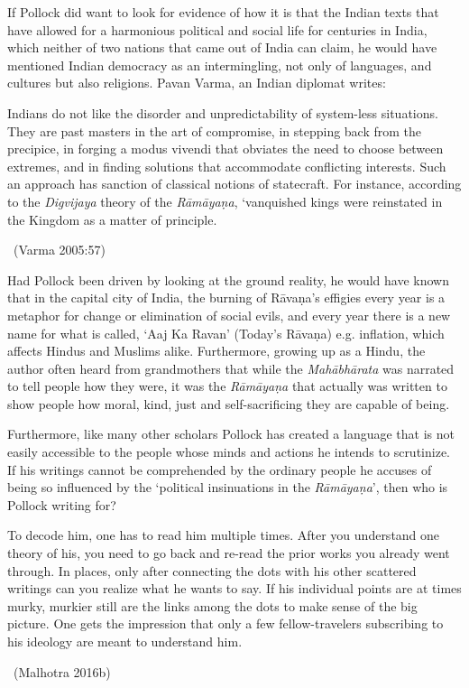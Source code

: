 If Pollock did want to look for evidence of how it is that the Indian texts that have allowed for a harmonious political and social life for centuries in India, which neither of two nations that came out of India can claim, he would have mentioned Indian democracy as an intermingling, not only of languages, and cultures but also religions. Pavan Varma, an Indian diplomat writes:

\begin{myquote}
Indians do not like the disorder and unpredictability of system-less situations. They are past masters in the art of compromise, in stepping back from the precipice, in forging a modus vivendi that obviates the need to choose between extremes, and in finding solutions that accommodate conflicting interests. Such an approach has sanction of classical notions of statecraft. For instance, according to the \textit{Digvijaya} theory of the \textit{Rāmāyaṇa}, ‘vanquished kings were reinstated in the Kingdom as a matter of principle. 

~\hfill (Varma 2005:57)
\end{myquote}

Had Pollock been driven by looking at the ground reality, he would have known that in the capital city of India, the burning of Rāvaṇa’s effigies every year is a metaphor for change or elimination of social evils, and every year there is a new name for what is called, ‘Aaj Ka Ravan’ (Today’s Rāvaṇa) e.g. inflation, which affects Hindus and Muslims alike. Furthermore, growing up as a Hindu, the author often heard from grandmothers that while the \textit{Mahābhārata} was narrated to tell people how they were, it was the \textit{Rāmāyaṇa} that actually was written to show people how moral, kind, just and self-sacrificing they are capable of being.

Furthermore, like many other scholars Pollock has created a language that is not easily accessible to the people whose minds and actions he intends to scrutinize. If his writings cannot be comprehended by the ordinary people he accuses of being so influenced by the ‘political insinuations in the \textit{Rāmāyaṇa}’, then who is Pollock writing for?

\begin{myquote}
To decode him, one has to read him multiple times. After you understand one theory of his, you need to go back and re-read the prior works you already went through. In places, only after connecting the dots with his other scattered writings can you realize what he wants to say. If his individual points are at times murky, murkier still are the links among the dots to make sense of the big picture. One gets the impression that only a few fellow-travelers subscribing to his ideology are meant to understand him. 

~\hfill (Malhotra 2016b)
\end{myquote}

